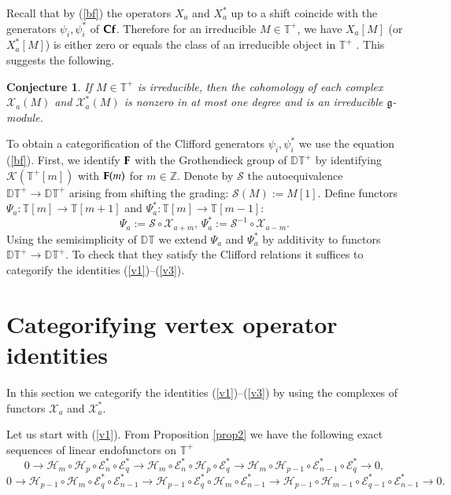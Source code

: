 \documentclass[11pt]{amsart}
\newcounter{theorem}
\newtheorem{conjecture}[theo]{Conjecture}
\newcommand{\TT}{\mathbb{T}}
\renewcommand{\gg}{\mathfrak{g}}
\begin{document}
Recall that by (\ref{bf}) the operators  $X_a$ and $X^*_a$ up to a shift coincide with the
generators $\psi_i,\psi^*_i$ of $\bold{Cf}$. Therefore  for an irreducible
$M\in \mathbb T^+$, we have $X_a[M]$ (or $X_a^*[M]$) is
either zero or equals the class of an irreducible object in $\mathbb T^+$ . This suggests the following.
\begin{conjecture} If $M\in\TT^+$ is irreducible, then the cohomology of each
  complex $\mathcal  X_a(M)$ and  $\mathcal  X_a^*(M)$ is nonzero in at most one degree
  and is an irreducible $\gg$-module. 
\end{conjecture}

To obtain a categorification of the Clifford generators  $\psi_i,\psi^*_i$ we use the equation (\ref {bf}). First, we 
identify $\bold F$ with the Grothendieck group of 
$\mathbb{DT}^+$ by identifying
$\mathcal K(\mathbb{T}^+[m])$ with $\bold F(m)$ for $m\in\mathbb Z$. Denote by $\mathcal{S}$ the autoequivalence $\mathbb{DT}^+\to \mathbb{DT}^+$ arising from
shifting the grading:
$\mathcal S(M):=M[1]$. Define functors $\Psi_a: \mathbb{T}[m]\to \mathbb{T}[m+1]$ and $\Psi^*_a: \mathbb{T}[m]\to \mathbb{T}[m-1]$: 
$$\Psi_a:=\mathcal S\circ\mathcal X_{a+m},\,\Psi^*_a:=\mathcal S^{-1}\circ\mathcal X_{a-m}.$$ 
Using the semisimplicity of  $\mathbb{DT}$ we extend $\Psi_a$ and $\Psi^*_a$ by additivity to functors $\mathbb{DT}^+\to \mathbb{DT}^+$. 
To check that they satisfy the Clifford 
relations it suffices to categorify the identities (\ref{v1})--(\ref{v3}).

\section{Categorifying vertex operator identities}

In this section we categorify the identities (\ref{v1})--(\ref{v3}) by using the complexes of functors
$\mathcal X_a$ and $\mathcal X_a^*$.

Let us start with (\ref{v1}).
From Proposition \ref{prop2} we have the following exact sequences of linear endofunctors on $\TT^+$
$$0\rightarrow \mathcal H_m\circ \mathcal H_p\circ\mathcal E^*_n\circ \mathcal E^*_q\rightarrow
 \mathcal H_m\circ \mathcal E^*_n\circ\mathcal H_p\circ \mathcal
 E^*_q \rightarrow  \mathcal H_m\circ \mathcal H_{p-1}\circ
   \mathcal E^*_{n-1}\circ \mathcal E^*_q\rightarrow 0,$$
$$0\rightarrow \mathcal H_{p-1}\circ \mathcal H_m\circ\mathcal
  E^*_{q}\circ \mathcal E^*_{n-1}\rightarrow\mathcal H_{p-1}\circ
   \mathcal E^*_{q}\circ \mathcal H_{m}
\circ\mathcal E^*_{n-1}\rightarrow  \mathcal H_{p-1}\circ  \mathcal H_{m-1}\circ \mathcal
E^*_{q-1}\circ \mathcal E^*_{n-1}\rightarrow 0.$$
\end{document}
